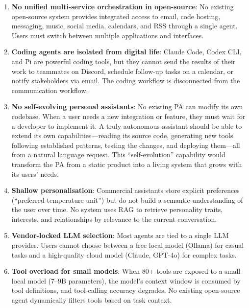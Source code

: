 \begin{enumerate}[leftmargin=*]
  \item \textbf{No unified multi-service orchestration in open-source}: No existing open-source system provides integrated access to email, code hosting, messaging, music, social media, calendars, and RSS through a single agent. Users must switch between multiple applications and interfaces.

  \item \textbf{Coding agents are isolated from digital life}: Claude Code, Codex CLI, and Pi are powerful coding tools, but they cannot send the results of their work to teammates on Discord, schedule follow-up tasks on a calendar, or notify stakeholders via email. The coding workflow is disconnected from the communication workflow.

  \item \textbf{No self-evolving personal assistants}: No existing PA can modify its own codebase. When a user needs a new integration or feature, they must wait for a developer to implement it. A truly autonomous assistant should be able to extend its own capabilities---reading its source code, generating new tools following established patterns, testing the changes, and deploying them---all from a natural language request. This ``self-evolution'' capability would transform the PA from a static product into a living system that grows with its users' needs.

  \item \textbf{Shallow personalisation}: Commercial assistants store explicit preferences (``preferred temperature unit'') but do not build a semantic understanding of the user over time. No system uses RAG to retrieve personality traits, interests, and relationships by relevance to the current conversation.

  \item \textbf{Vendor-locked LLM selection}: Most agents are tied to a single LLM provider. Users cannot choose between a free local model (Ollama) for casual tasks and a high-quality cloud model (Claude, GPT-4o) for complex tasks.

  \item \textbf{Tool overload for small models}: When 80+ tools are exposed to a small local model (7--9B parameters), the model's context window is consumed by tool definitions, and tool-calling accuracy degrades. No existing open-source agent dynamically filters tools based on task context.
\end{enumerate}
